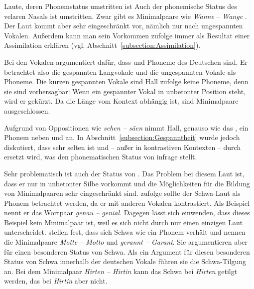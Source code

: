 \begin{Exkurs}{Laute, deren Phonemstatus umstritten ist}
Auch der phonemische Status des velaren Nasals ist umstritten. Zwar gibt es Minimalpaare wie \textit{Wanne} \textipa{[\textprimstress va\.*n@]} -- \textit{Wange} \textipa{[\textprimstress va\.*N@]} \citep[63]{FuhrhopPeters2013}. Der Laut kommt aber sehr eingeschränkt vor, nämlich nur nach ungespannten Vokalen. Außerdem kann man sein Vorkommen \citet[66f]{Hall2000} zufolge immer als Resultat einer Assimilation erklären (vgl. Abschnitt~\ref{subsection:Assimilation}).

Bei den Vokalen argumentiert \citet[68--70]{Hall2000} dafür, dass  und  Phoneme des Deutschen sind. Er betrachtet also die gespannten Langvokale und die ungespannten Vokale als Phoneme. Die kurzen gespannten Vokale \textipa{[i, y, e, u, o, \o]} sind Hall zufolge keine Phoneme, denn sie sind vorhersagbar: Wenn ein gespannter Vokal in unbetonter Position steht, wird er gekürzt. Da die Länge vom Kontext abhängig ist, sind Minimalpaare ausgeschlossen.

Aufgrund von Oppositionen wie \textit{sehen -- säen} nimmt Hall, genauso wie das \citet{DudenAussprache2023}, ein Phonem  neben  und  an. In Abschnitt~\ref{subsection:Gespanntheit} wurde jedoch diskutiert, dass \textipa{[E:]} sehr selten ist und -- außer in kontrastiven Kontexten -- durch \textipa{[e:]} ersetzt wird, was den phonematischen Status von \textipa{[E:]} infrage stellt.

Sehr problematisch ist auch der Status von \textipa{[@]}. Das Problem bei diesem Laut ist, dass er nur in unbetonter Silbe vorkommt und die Möglichkeiten für die Bildung von Minimalpaaren sehr eingeschränkt sind. \citet[70]{Hall2000} zufolge sollte der Schwa-Laut als Phonem betrachtet werden, da er mit anderen Vokalen kontrastiert. Als Beispiel nennt er das Wortpaar \textit{genau -- genial}. Dagegen lässt sich einwenden, dass dieses Beispiel kein Minimalpaar ist, weil es sich nicht durch nur einen einzigen Laut unterscheidet. \citet[59]{FuhrhopPeters2013} stellen fest, dass sich Schwa wie ein Phonem verhält und nennen die Minimalpaare \textit{Motte -- Motto} und \textit{gerannt -- Garant}. Sie argumentieren aber für einen besonderen Status von Schwa. Als ein Argument für diesen besonderen Status von Schwa innerhalb der deutschen Vokale führen sie die Schwa-Tilgung an. Bei dem Minimalpaar \textit{Hirten -- Hirtin} kann das Schwa bei \textit{Hirten} getilgt werden, das  bei \textit{Hirtin} aber nicht. 


\end{Exkurs}

